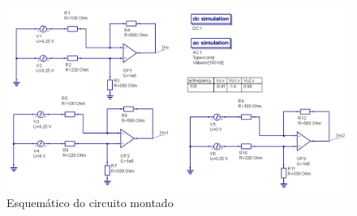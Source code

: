     \begin{figure}[H]
        \centering
        \includegraphics[width=\textwidth]{imagens/CircuitoC/sim_c.png}
        \caption{Esquemático do circuito montado}
        \label{fig:circuito_c_sim}
    \end{figure}